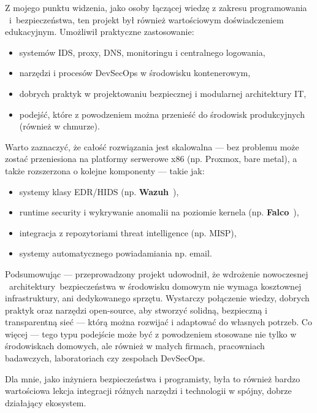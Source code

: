 \documentclass[
    left=2.5cm,         %
    right=2.5cm,        %
    top=2.5cm,          %
    bottom=3cm,         %
    bindingoffset=6mm,  %
    nohyphenation=true %
]{eiti/eiti-thesis} %
\begin{document}
Z mojego punktu widzenia, jako osoby łączącej wiedzę z zakresu programowania ~i~bezpieczeństwa, ten projekt był również wartościowym doświadczeniem edukacyjnym. Umożliwił praktyczne zastosowanie:
\begin{itemize}
    \item systemów IDS, proxy, DNS, monitoringu i centralnego logowania,
    \item narzędzi i procesów DevSecOps w środowisku kontenerowym,
    \item dobrych praktyk w projektowaniu bezpiecznej i modularnej architektury IT,
    \item podejść, które z powodzeniem można przenieść do środowisk produkcyjnych (również w chmurze).
\end{itemize}

Warto zaznaczyć, że całość rozwiązania jest skalowalna — bez problemu może zostać przeniesiona na platformy serwerowe x86 (np. Proxmox, bare metal), a także rozszerzona o kolejne komponenty — takie jak:
\begin{itemize}
    \item systemy klasy EDR/HIDS (np. \textbf{Wazuh}~\cite{wazuh_agent}),
    \item runtime security i wykrywanie anomalii na poziomie kernela (np. \textbf{Falco}~\cite{falco_docs}),
    \item integracja z repozytoriami threat intelligence (np. MISP),
    \item systemy automatycznego powiadamiania np. email.
\end{itemize}

Podsumowując — przeprowadzony projekt udowodnił, że wdrożenie nowoczesnej ~architektury~bezpieczeństwa w środowisku domowym nie wymaga kosztownej infrastruktury, 
ani dedykowanego sprzętu. Wystarczy połączenie wiedzy, dobrych praktyk oraz narzędzi open-source, aby stworzyć solidną, bezpieczną i transparentną sieć — którą można rozwijać i adaptować do własnych potrzeb. Co więcej — tego typu podejście może być z powodzeniem stosowane nie tylko w środowiskach domowych, ale również w małych firmach, pracowniach badawczych, laboratoriach czy zespołach DevSecOps.

Dla mnie, jako inżyniera bezpieczeństwa i programisty, była to również bardzo wartościowa lekcja integracji różnych narzędzi i technologii w spójny, dobrze działający ekosystem.



\newpage

\end{document}
